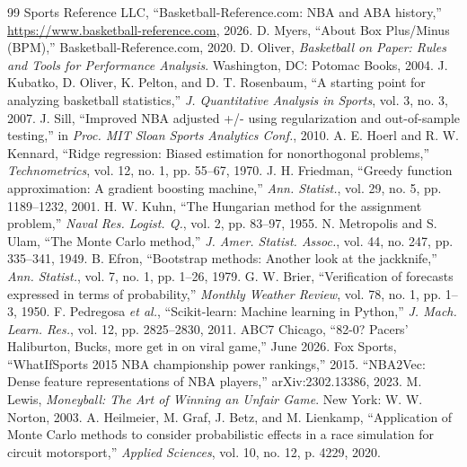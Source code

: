 \documentclass[conference,a4paper]{IEEEtran}
\begin{document}
\vspace{2\baselineskip}
\begin{thebibliography}{99}
 Sports Reference LLC, ``Basketball-Reference.com: NBA and ABA history,'' \url{https://www.basketball-reference.com}, 2026.
 D. Myers, ``About Box Plus/Minus (BPM),'' Basketball-Reference.com, 2020.
 D. Oliver, \emph{Basketball on Paper: Rules and Tools for Performance Analysis}. Washington, DC: Potomac Books, 2004.
 J. Kubatko, D. Oliver, K. Pelton, and D. T. Rosenbaum, ``A starting point for analyzing basketball statistics,'' \emph{J. Quantitative Analysis in Sports}, vol. 3, no. 3, 2007.
 J. Sill, ``Improved NBA adjusted +/- using regularization and out-of-sample testing,'' in \emph{Proc. MIT Sloan Sports Analytics Conf.}, 2010.
 A. E. Hoerl and R. W. Kennard, ``Ridge regression: Biased estimation for nonorthogonal problems,'' \emph{Technometrics}, vol. 12, no. 1, pp. 55--67, 1970.
 J. H. Friedman, ``Greedy function approximation: A gradient boosting machine,'' \emph{Ann. Statist.}, vol. 29, no. 5, pp. 1189--1232, 2001.
 H. W. Kuhn, ``The Hungarian method for the assignment problem,'' \emph{Naval Res. Logist. Q.}, vol. 2, pp. 83--97, 1955.
 N. Metropolis and S. Ulam, ``The Monte Carlo method,'' \emph{J. Amer. Statist. Assoc.}, vol. 44, no. 247, pp. 335--341, 1949.
 B. Efron, ``Bootstrap methods: Another look at the jackknife,'' \emph{Ann. Statist.}, vol. 7, no. 1, pp. 1--26, 1979.
 G. W. Brier, ``Verification of forecasts expressed in terms of probability,'' \emph{Monthly Weather Review}, vol. 78, no. 1, pp. 1--3, 1950.
 F. Pedregosa \emph{et al.}, ``Scikit-learn: Machine learning in Python,'' \emph{J. Mach. Learn. Res.}, vol. 12, pp. 2825--2830, 2011.
 ABC7 Chicago, ``82-0? Pacers' Haliburton, Bucks, more get in on viral game,'' June 2026.
 Fox Sports, ``WhatIfSports 2015 NBA championship power rankings,'' 2015.
 ``NBA2Vec: Dense feature representations of NBA players,'' arXiv:2302.13386, 2023.
 M. Lewis, \emph{Moneyball: The Art of Winning an Unfair Game}. New York: W. W. Norton, 2003.
 A. Heilmeier, M. Graf, J. Betz, and M. Lienkamp, ``Application of Monte Carlo methods to consider probabilistic effects in a race simulation for circuit motorsport,'' \emph{Applied Sciences}, vol. 10, no. 12, p. 4229, 2020.
\end{thebibliography}
\end{document}
